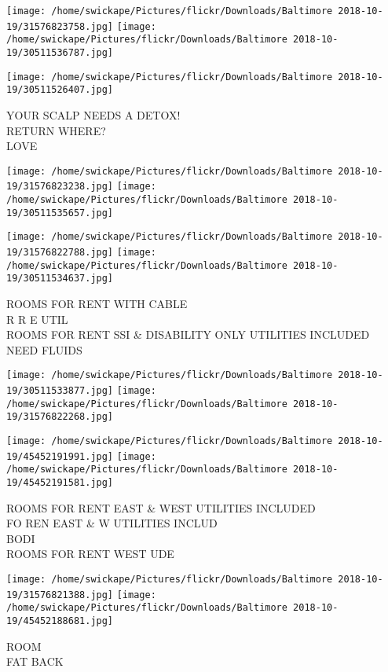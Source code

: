 \documentclass[10pt,letterpaper]{article}
\begin{document}
\texttt{[image: /home/swickape/Pictures/flickr/Downloads/Baltimore 2018-10-19/31576823758.jpg]}
\texttt{[image: /home/swickape/Pictures/flickr/Downloads/Baltimore 2018-10-19/30511536787.jpg]}

\vspace{0.25in}
\texttt{[image: /home/swickape/Pictures/flickr/Downloads/Baltimore 2018-10-19/30511526407.jpg]}

YOUR SCALP NEEDS A DETOX!\\
RETURN WHERE?\\
LOVE\\
\pagebreak

\texttt{[image: /home/swickape/Pictures/flickr/Downloads/Baltimore 2018-10-19/31576823238.jpg]}
\texttt{[image: /home/swickape/Pictures/flickr/Downloads/Baltimore 2018-10-19/30511535657.jpg]}

\texttt{[image: /home/swickape/Pictures/flickr/Downloads/Baltimore 2018-10-19/31576822788.jpg]}
\texttt{[image: /home/swickape/Pictures/flickr/Downloads/Baltimore 2018-10-19/30511534637.jpg]}

ROOMS FOR RENT WITH CABLE\\
R R E UTIL\\
ROOMS FOR RENT SSI \& DISABILITY ONLY UTILITIES INCLUDED\\
NEED FLUIDS\\
\pagebreak

\texttt{[image: /home/swickape/Pictures/flickr/Downloads/Baltimore 2018-10-19/30511533877.jpg]}
\texttt{[image: /home/swickape/Pictures/flickr/Downloads/Baltimore 2018-10-19/31576822268.jpg]}

\texttt{[image: /home/swickape/Pictures/flickr/Downloads/Baltimore 2018-10-19/45452191991.jpg]}
\texttt{[image: /home/swickape/Pictures/flickr/Downloads/Baltimore 2018-10-19/45452191581.jpg]}

ROOMS FOR RENT EAST \& WEST UTILITIES INCLUDED\\
FO REN EAST \& W UTILITIES INCLUD\\
BODI\\
ROOMS FOR RENT WEST UDE\\
\pagebreak

\texttt{[image: /home/swickape/Pictures/flickr/Downloads/Baltimore 2018-10-19/31576821388.jpg]}
\texttt{[image: /home/swickape/Pictures/flickr/Downloads/Baltimore 2018-10-19/45452188681.jpg]}

ROOM\\
FAT BACK\\
\pagebreak
\end{document}
